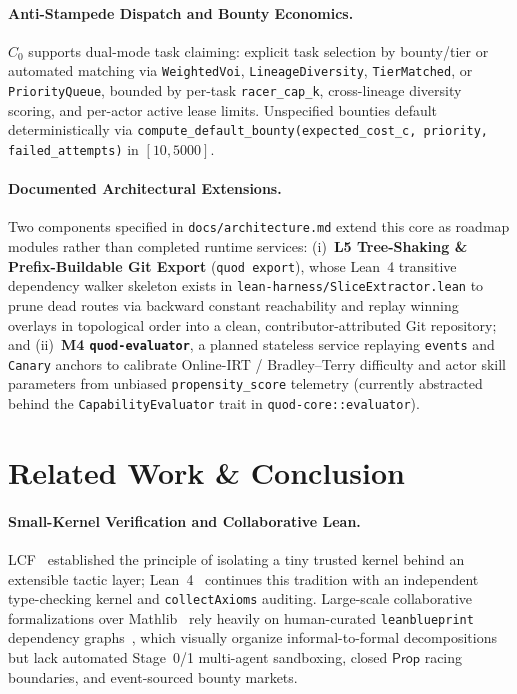\documentclass[sigplan,nonacm,10pt]{acmart}
\newcommand{\Prop}{\mathsf{Prop}}
\newcommand{\code}[1]{\texttt{#1}}
\begin{document}
\paragraph{Anti-Stampede Dispatch and Bounty Economics.}
$C_0$ supports dual-mode task claiming: explicit task selection by bounty/tier or automated matching via \code{WeightedVoi}, \code{LineageDiversity}, \code{TierMatched}, or \code{PriorityQueue}, bounded by per-task \code{racer\_cap\_k}, cross-lineage diversity scoring, and per-actor active lease limits. Unspecified bounties default deterministically via \code{compute\_\-default\_\-bounty(\-expected\_cost\_c,\; priority,\; failed\_attempts)} in $[10, 5000]$.

\paragraph{Documented Architectural Extensions.}
Two components specified in \code{docs/architecture.md} extend this core as roadmap modules rather than completed runtime services:
(i)~\textbf{L5 Tree-Shaking \& Prefix-Buildable Git Export} (\code{quod export}), whose Lean~4 transitive dependency walker skeleton exists in \code{lean-harness/\-SliceExtractor.lean} to prune dead routes via backward constant reachability and replay winning overlays in topological order into a clean, contributor-attributed Git repository; and
(ii)~\textbf{M4 \code{quod-evaluator}}, a planned stateless service replaying \code{events} and \code{Canary} anchors to calibrate Online-IRT / Bradley--Terry difficulty and actor skill parameters from unbiased \code{propensity\_\-score} telemetry (currently abstracted behind the \code{Capability\-Evaluator} trait in \code{quod-core::\-evaluator}).

\section{Related Work \& Conclusion}\label{sec:related}

\paragraph{Small-Kernel Verification and Collaborative Lean.}
LCF~\cite{gordon1979edinburgh} established the principle of isolating a tiny trusted kernel behind an extensible tactic layer; Lean~4~\cite{demoura2021lean4} continues this tradition with an independent type-checking kernel and \code{collectAxioms} auditing. Large-scale collaborative formalizations over Mathlib~\cite{mathlib2020} rely heavily on human-curated \code{leanblueprint} dependency graphs~\cite{massot2024blueprint}, which visually organize informal-to-formal decompositions but lack automated Stage~0/1 multi-agent sandboxing, closed $\Prop$ racing boundaries, and event-sourced bounty markets.
\end{document}
